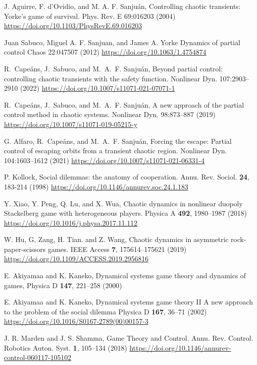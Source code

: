 \begin{thebibliography}{04}





J. Aguirre, F. d’Ovidio, and M. A. F. Sanjuán,
Controlling chaotic transients: Yorke’s game of survival.
Phys. Rev. E 69:016203
(2004)
\url{https://doi.org/10.1103/PhysRevE.69.016203}



Juan Sabuco, Miguel A. F. Sanjuan, and James A. Yorke
Dynamics of partial control
Chaos 22:047507
(2012)
\url{https://doi.org/10.1063/1.4754874}


R.~Cape{\'a}ns, J.~Sabuco, and M.~A.~F. Sanju{\'a}n, 
Beyond partial control: controlling chaotic transients
with the safety function.
Nonlinear Dyn. 107:2903–2910
(2022)
\url{https://doi.org/10.1007/s11071-021-07071-1}

R.~Cape{\'a}ns, J.~Sabuco, and M.~A.~F. Sanju{\'a}n, 
A new approach of the partial control method in chaotic systems.
Nonlinear Dyn. 98:873--887
(2019)
\url{https://doi.org/10.1007/s11071-019-05215-y}

G. Alfaro, R.~Cape{\'a}ns, and M.~A.~F. Sanju{\'a}n, 
Forcing the escape: Partial control of escaping orbits from a
transient chaotic region.
Nonlinear Dyn. 104:1603–1612
(2021) 
\url{https://doi.org/10.1007/s11071-021-06331-4}





P. Kollock,
Social dilemmas: the anatomy of cooperation.
Annu. Rev. Sociol. \textbf{24}, 183-214
(1998)
\url{https://doi.org/10.1146/annurev.soc.24.1.183}

Y. Xiao, Y. Peng, Q. Lu, and X. Wua,
Chaotic dynamics in nonlinear duopoly Stackelberg game
with heterogeneous players.
Physica A \textbf{492}, 1980--1987
(2018)
\url{https://doi.org/10.1016/j.physa.2017.11.112}

W. Hu, G. Zang, H. Tian. and Z. Wang,
Chaotic dynamics in asymmetric rock-paper-scissors games.
IEEE Access \textbf{7}, 175614--175621
(2019)
\url{https://doi.org/10.1109/ACCESS.2019.2956816}

E. Akiyamaa and K. Kaneko,
Dynamical systems game theory and dynamics of games,
Physica D \textbf{147}, 221--258
(2000)
\url{}

E. Akiyamaa and K. Kaneko,
Dynamical systems game theory II
A new approach to the problem of the social dilemma
Physica D \textbf{167}, 36--71
(2002)
\url{https://doi.org/10.1016/S0167-2789(00)00157-3}

J. R. Marden and J. S. Shamma,
Game Theory and Control.
Annu. Rev. Control. Robotics Auton. Syst. \textbf{1}, 105--134
(2018)
\url{https://doi.org/10.1146/annurev-control-060117-105102}




\end{thebibliography}